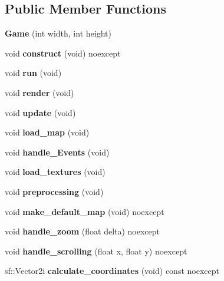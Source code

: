 \subsection*{Public Member Functions}
\begin{DoxyCompactItemize}
\item 
\mbox{\label{class_game_a5bc07cf8947858f32637943836cc6f8e}} 
{\bfseries Game} (int width, int height)
\item 
\mbox{\label{class_game_a1e5138ddc86047f2cb1171758a583df1}} 
void {\bfseries construct} (void) noexcept
\item 
\mbox{\label{class_game_a46165f87463fa8114fa44596ced90dbd}} 
void {\bfseries run} (void)
\item 
\mbox{\label{class_game_aee38b1aa52dba2855f2457d22b3df13f}} 
void {\bfseries render} (void)
\item 
\mbox{\label{class_game_a36bf09723c976fe477bc774cc1d03b3f}} 
void {\bfseries update} (void)
\item 
\mbox{\label{class_game_a16c9b0feaf6b088bdcd591c731e68981}} 
void {\bfseries load\+\_\+map} (void)
\item 
\mbox{\label{class_game_a8bf297e096e1818ee04490704dd2aa47}} 
void {\bfseries handle\+\_\+\+Events} (void)
\item 
\mbox{\label{class_game_a33ba12022b4e9211e47231a2cb7420a8}} 
void {\bfseries load\+\_\+textures} (void)
\item 
\mbox{\label{class_game_a8ee964a0e77476e2755be37868c67db6}} 
void {\bfseries preprocessing} (void)
\item 
\mbox{\label{class_game_ab557af9fcbd7bf45c3bd98ba6014b79b}} 
void {\bfseries make\+\_\+default\+\_\+map} (void) noexcept
\item 
\mbox{\label{class_game_a6a0260cb97b25515e10b7fd2239780cc}} 
void {\bfseries handle\+\_\+zoom} (float delta) noexcept
\item 
\mbox{\label{class_game_ae37df91bc39bf902d49477d2023601a7}} 
void {\bfseries handle\+\_\+scrolling} (float x, float y) noexcept
\item 
\mbox{\label{class_game_aa98202aec960f630979076cfdd1754a8}} 
sf\+::\+Vector2i {\bfseries calculate\+\_\+coordinates} (void) const noexcept
\end{DoxyCompactItemize}
